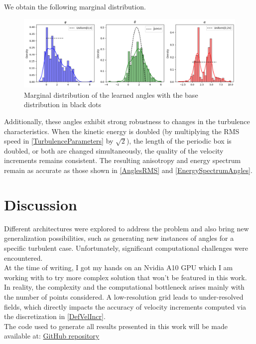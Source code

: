 \documentclass[a4paper,12pt]{article}
\theoremstyle{definition}
\begin{document}
We obtain the following marginal distribution.
\begin{figure}[H]
    \centering 
    \includegraphics[width=1.0\linewidth]{illustrations/AnglesDistributionLearned.png}
    \caption{Marginal distribution of the learned angles with the base distribution in black dots}
\end{figure}

Additionally, these angles exhibit strong robustness to changes in the turbulence characteristics. When the kinetic energy is doubled (by multiplying the RMS speed in \ref{TurbulenceParameters} by $\sqrt{2}$), the length of the periodic box is doubled, or both are changed simultaneously, the quality of the velocity increments remains consistent. The resulting anisotropy and energy spectrum remain as accurate as those shown in \ref{AnglesRMS} and \ref{EnergySpectrumAngles}.

\section{Discussion} \label{Discussion}

Different architectures were explored to address the problem and also bring new generalization possibilities, such as generating new instances of angles for a specific turbulent case. Unfortunately, significant computational challenges were encountered. \\
At the time of writing, I got my hands on an Nvidia A10 GPU which I am working with to try more complex solution that won't be featured in this work. \\
In reality, the complexity and the computational bottleneck arises mainly with the number of points considered. A low-resolution grid leads to under-resolved fields, which directly impacts the accuracy of velocity increments computed via the discretization in \ref{DefVelIncr}. \\
The code used to generate all results presented in this work will be made available at: \href{https://github.com/SamyBraik/InternshipCode}{GitHub repository}
\newpage
\end{document}
